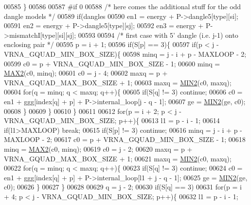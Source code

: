 \begin{DoxyCode}
00585     \}
00586 
00587 \textcolor{preprocessor}{#if 0}
00588   \textcolor{comment}{/* here comes the additional stuff for the odd dangle models */}
00589   \textcolor{keywordflow}{if}(dangles %
00590     en1 = energy + P->dangle5[type][si];
00591     en2 = energy + P->dangle5[type][sj];
00592     en3 = energy + P->mismatchI[type][si][sj];
00593 
00594     \textcolor{comment}{/* first case with 5' dangle (i.e. j-1) onto enclosing pair */}
00595     p = i + 1;
00596     \textcolor{keywordflow}{if}(S[p] == 3)\{
00597       \textcolor{keywordflow}{if}(p < j - VRNA\_GQUAD\_MIN\_BOX\_SIZE)\{
00598         minq  = j - i + p - MAXLOOP - 2;
00599         c0    = p + VRNA\_GQUAD\_MIN\_BOX\_SIZE - 1;
00600         minq  = \hyperlink{group__utils_ga33297b3679c713b0c4d897cd0fe3b122}{MAX2}(c0, minq);
00601         c0    = j - 4;
00602         maxq  = p + VRNA\_GQUAD\_MAX\_BOX\_SIZE + 1;
00603         maxq  = \hyperlink{group__utils_gae0b9cd0ce090bd69b951aa73e8fa4f7d}{MIN2}(c0, maxq);
00604         \textcolor{keywordflow}{for}(q = minq; q < maxq; q++)\{
00605           \textcolor{keywordflow}{if}(S[q] != 3) \textcolor{keywordflow}{continue};
00606           c0  = en1 + ggg[index[q] + p] + P->internal\_loop[j - q - 1];
00607           ge  = \hyperlink{group__utils_gae0b9cd0ce090bd69b951aa73e8fa4f7d}{MIN2}(ge, c0);
00608         \}
00609       \}
00610     \}
00611 
00612     \textcolor{keywordflow}{for}(p = i + 2; p < j - VRNA\_GQUAD\_MIN\_BOX\_SIZE; p++)\{
00613       l1    = p - i - 1;
00614       \textcolor{keywordflow}{if}(l1>MAXLOOP) \textcolor{keywordflow}{break};
00615       \textcolor{keywordflow}{if}(S[p] != 3) \textcolor{keywordflow}{continue};
00616       minq  = j - i + p - MAXLOOP - 2;
00617       c0    = p + VRNA\_GQUAD\_MIN\_BOX\_SIZE - 1;
00618       minq  = \hyperlink{group__utils_ga33297b3679c713b0c4d897cd0fe3b122}{MAX2}(c0, minq);
00619       c0    = j - 2;
00620       maxq  = p + VRNA\_GQUAD\_MAX\_BOX\_SIZE + 1;
00621       maxq  = \hyperlink{group__utils_gae0b9cd0ce090bd69b951aa73e8fa4f7d}{MIN2}(c0, maxq);
00622       \textcolor{keywordflow}{for}(q = minq; q < maxq; q++)\{
00623         \textcolor{keywordflow}{if}(S[q] != 3) \textcolor{keywordflow}{continue};
00624         c0  = en1 + ggg[index[q] + p] + P->internal\_loop[l1 + j - q - 1];
00625         ge   = \hyperlink{group__utils_gae0b9cd0ce090bd69b951aa73e8fa4f7d}{MIN2}(ge, c0);
00626       \}
00627     \}
00628 
00629     q = j - 2;
00630     \textcolor{keywordflow}{if}(S[q] == 3)
00631       \textcolor{keywordflow}{for}(p = i + 4; p < j - VRNA\_GQUAD\_MIN\_BOX\_SIZE; p++)\{
00632         l1    = p - i - 1;

\end{DoxyCode}
